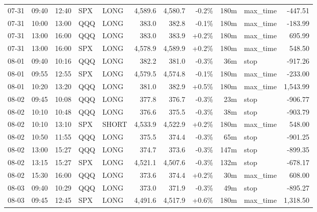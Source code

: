 \documentclass[11pt,a4paper,twoside]{article}
\begin{document}
\begin{center}
\begin{longtable}{>{\color{txtmain}}l l l l l r r r r >{\color{txtmain}}l r}
07-31 & 09:40 & 12:40 & SPX & LONG & 4,589.6 & 4,580.7 & \textcolor{lossred}{-0.2\%} & 180m & max\_time & \textcolor{lossred}{-447.51} \\
07-31 & 10:00 & 13:00 & QQQ & LONG & 383.0 & 382.8 & \textcolor{lossred}{-0.1\%} & 180m & max\_time & \textcolor{lossred}{-183.99} \\
07-31 & 13:00 & 16:00 & QQQ & LONG & 383.0 & 383.9 & \textcolor{wingreen}{+0.2\%} & 180m & max\_time & \textcolor{wingreen}{695.99} \\
07-31 & 13:00 & 16:00 & SPX & LONG & 4,578.9 & 4,589.9 & \textcolor{wingreen}{+0.2\%} & 180m & max\_time & \textcolor{wingreen}{548.50} \\
08-01 & 09:40 & 10:16 & QQQ & LONG & 382.2 & 381.0 & \textcolor{lossred}{-0.3\%} & 36m & stop & \textcolor{lossred}{-917.26} \\
08-01 & 09:55 & 12:55 & SPX & LONG & 4,579.5 & 4,574.8 & \textcolor{lossred}{-0.1\%} & 180m & max\_time & \textcolor{lossred}{-233.00} \\
08-01 & 10:20 & 13:20 & QQQ & LONG & 381.0 & 382.9 & \textcolor{wingreen}{+0.5\%} & 180m & max\_time & \textcolor{wingreen}{1,543.99} \\
08-02 & 09:45 & 10:08 & QQQ & LONG & 377.8 & 376.7 & \textcolor{lossred}{-0.3\%} & 23m & stop & \textcolor{lossred}{-906.77} \\
08-02 & 10:10 & 10:48 & QQQ & LONG & 376.6 & 375.5 & \textcolor{lossred}{-0.3\%} & 38m & stop & \textcolor{lossred}{-903.79} \\
08-02 & 10:10 & 13:10 & SPX & SHORT & 4,533.9 & 4,522.9 & \textcolor{wingreen}{+0.2\%} & 180m & max\_time & \textcolor{wingreen}{548.00} \\
08-02 & 10:50 & 11:55 & QQQ & LONG & 375.5 & 374.4 & \textcolor{lossred}{-0.3\%} & 65m & stop & \textcolor{lossred}{-901.25} \\
08-02 & 13:00 & 15:27 & QQQ & LONG & 374.7 & 373.6 & \textcolor{lossred}{-0.3\%} & 147m & stop & \textcolor{lossred}{-899.35} \\
08-02 & 13:15 & 15:27 & SPX & LONG & 4,521.1 & 4,507.6 & \textcolor{lossred}{-0.3\%} & 132m & stop & \textcolor{lossred}{-678.17} \\
08-02 & 15:30 & 16:00 & QQQ & LONG & 373.6 & 374.4 & \textcolor{wingreen}{+0.2\%} & 30m & max\_time & \textcolor{wingreen}{608.00} \\
08-03 & 09:40 & 10:29 & QQQ & LONG & 373.0 & 371.9 & \textcolor{lossred}{-0.3\%} & 49m & stop & \textcolor{lossred}{-895.27} \\
08-03 & 09:45 & 12:45 & SPX & LONG & 4,491.6 & 4,517.9 & \textcolor{wingreen}{+0.6\%} & 180m & max\_time & \textcolor{wingreen}{1,318.50} \\

\end{longtable}
\end{center}
\end{document}
